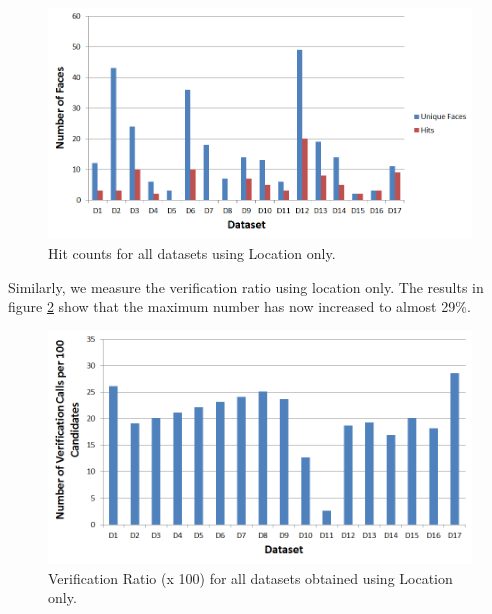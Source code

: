 \begin{figure}[ht]
\centering
\includegraphics[width=\textwidth]{media/chapter5/axis/loc-unique-faces-hits-all-datasets.png}
\caption{Hit counts for all datasets using Location only.}
\label{fig:exp-loc-hits}
\end{figure}

Similarly, we measure the verification ratio using location only. The results in figure \ref{fig:exp-loc-verification-ratio} show that the maximum number has now increased to almost 29\%. 

\begin{figure}[h!]
\centering
\includegraphics[width=\textwidth]{media/chapter5/axis/loc-verification-ratio-all-datasets.png}
\caption{Verification Ratio (x 100) for all datasets obtained using Location only.}
\label{fig:exp-loc-verification-ratio}
\end{figure}


